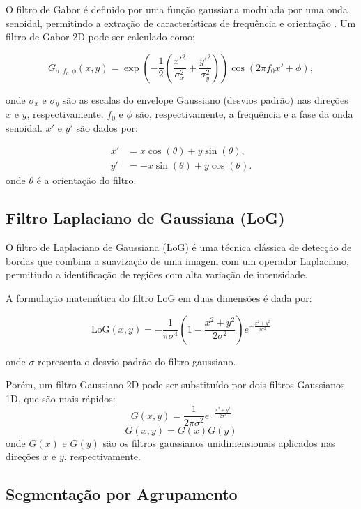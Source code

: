 \documentclass[sigconf,nonacm]{acmart}
\begin{document}
O filtro de Gabor é definido por uma função gaussiana modulada por uma onda senoidal, permitindo a extração de características de frequência e orientação \cite{texture_feature_humeau_2019}. Um filtro de Gabor 2D pode ser calculado como:

\[
G_{\sigma,f_0,\phi}(x,y) = \exp\left(-\frac{1}{2} \left(\frac{x'^2}{\sigma_x^2} + \frac{y'^2}{\sigma_y^2}\right)\right) \cos\left(2\pi f_0 x' + \phi\right),
\]

onde \(\sigma_x\) e \(\sigma_y\) são as escalas do envelope Gaussiano (desvios padrão) nas direções \(x\) e \(y\), respectivamente. \(f_0\) e \(\phi\) são, respectivamente, a frequência e a fase da onda senoidal. \(x'\) e \(y'\) são dados por:

\[
\begin{aligned}
x' &= x \cos(\theta) + y \sin(\theta), \\
y' &= -x \sin(\theta) + y \cos(\theta).
\end{aligned}
\]
onde \(\theta\) é a orientação do filtro.

\subsection{Filtro Laplaciano de Gaussiana (LoG)}

O filtro de Laplaciano de Gaussiana (LoG) é uma técnica clássica de detecção de bordas que combina a suavização de uma imagem com um operador Laplaciano, permitindo a identificação de regiões com alta variação de intensidade.

A formulação matemática do filtro LoG em duas dimensões é dada por:

\[
\text{LoG}(x, y) = -\frac{1}{\pi\sigma^4}\left(1 - \frac{x^2 + y^2}{2\sigma^2}\right)e^{-\frac{x^2 + y^2}{2\sigma^2}}
\]

onde \(\sigma\) representa o desvio padrão do filtro gaussiano.

Porém, um filtro Gaussiano 2D pode ser
substituído por dois filtros Gaussianos 1D,
que são mais rápidos:
\[
G(x,y) = \frac{1}{2\pi\sigma^2}e^{-\frac{x^2 + y^2}{2\sigma^2}} 
\]
\[
G(x,y) = G(x)G(y)
\]
onde \(G(x)\) e \(G(y)\) são os filtros gaussianos unidimensionais aplicados nas direções \(x\) e \(y\), respectivamente.



\subsection{Segmentação por Agrupamento}
\end{document}
